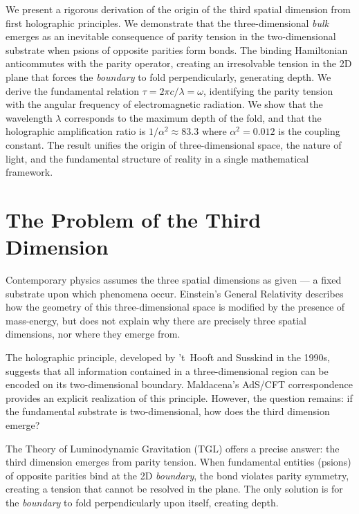 \documentclass[12pt,a4paper,twoside]{article}
\newcommand{\alphaii}{\alpha^{2}}
\newcommand{\boundary}{\textit{boundary}}
\newcommand{\bulk}{\textit{bulk}}
\begin{document}
\noindent We present a rigorous derivation of the origin of the third spatial dimension from first holographic principles. We demonstrate that the three-dimensional \bulk{} emerges as an inevitable consequence of parity tension in the two-dimensional substrate when psions of opposite parities form bonds. The binding Hamiltonian anticommutes with the parity operator, creating an irresolvable tension in the 2D plane that forces the \boundary{} to fold perpendicularly, generating depth. We derive the fundamental relation $\tau = 2\pi c/\lambda = \omega$, identifying the parity tension with the angular frequency of electromagnetic radiation. We show that the wavelength $\lambda$ corresponds to the maximum depth of the fold, and that the holographic amplification ratio is $1/\alphaii \approx 83.3$ where $\alphaii = 0.012$ is the coupling constant. The result unifies the origin of three-dimensional space, the nature of light, and the fundamental structure of reality in a single mathematical framework.


\section{The Problem of the Third Dimension}


Contemporary physics assumes the three spatial dimensions as given --- a fixed substrate upon which phenomena occur. Einstein's General Relativity describes how the geometry of this three-dimensional space is modified by the presence of mass-energy, but does not explain why there are precisely three spatial dimensions, nor where they emerge from.

The holographic principle, developed by 't~Hooft and Susskind in the 1990s, suggests that all information contained in a three-dimensional region can be encoded on its two-dimensional boundary. Maldacena's AdS/CFT correspondence provides an explicit realization of this principle. However, the question remains: if the fundamental substrate is two-dimensional, how does the third dimension emerge?

The Theory of Luminodynamic Gravitation (TGL) offers a precise answer: the third dimension emerges from parity tension. When fundamental entities (psions) of opposite parities bind at the 2D \boundary, the bond violates parity symmetry, creating a tension that cannot be resolved in the plane. The only solution is for the \boundary{} to fold perpendicularly upon itself, creating depth.
\end{document}
